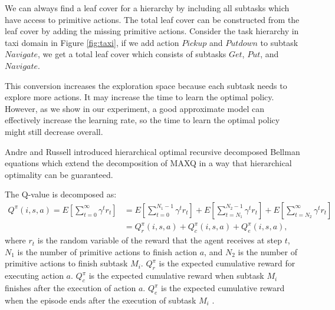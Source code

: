 We can always find a leaf cover for a hierarchy by including all subtasks which have access
to primitive actions. The total leaf cover can be constructed from the leaf cover by
adding the missing primitive actions.
Consider the task hierarchy in taxi domain in Figure \ref{fig:taxi},
if we add action $Pickup$ and $Putdown$ to subtask $Navigate$, 
we get a total leaf cover which consists of subtasks $Get$, $Put$, and $Navigate$.

This conversion increases the exploration space because each subtask needs to explore more actions. It may increase 
the time to learn the optimal policy. However, as we show in our experiment, a good approximate model can effectively increase
the learning rate, so the time to learn the optimal policy might still decrease overall.


Andre and Russell \cite{OptimalQ}\cite{HORDQ} introduced hierarchical optimal recursive decomposed Bellman equations
which extend the decomposition of MAXQ in a way that hierarchical optimality
can be guaranteed.

The Q-value is decomposed as:
\begin{align}
    \label{eq:HordQ}
    Q^{\pi}(i, s, a) = E[\sum_{t=0}^{\infty}\gamma^t r_t] &= E[\sum_{t=0}^{N_1 - 1}\gamma^t r_t] + E[\sum_{t=N_1}^{N_2 - 1}\gamma^t r_t] + E[\sum_{t=N_2}^{\infty}\gamma^t r_t]\\
                    &= Q_r^{\pi}(i, s, a) + Q_c^{\pi}(i, s, a) + Q_e^{\pi}(i, s, a),
\end{align}
where $r_t$ is the random variable of the reward that the agent receives at step $t$, $N_1$ is the number of primitive actions to finish action $a$, 
and $N_2$ is the number of primitive actions 
to finish subtask $M_i$. $ Q_r^{\pi}$ is the expected cumulative reward for executing action $a$.
$Q_c^{\pi}$ is the expected cumulative reward when subtask $M_i$ finishes after the execution of action $a$. 
$Q_e^{\pi}$ is the expected cumulative reward when the episode ends after the execution of subtask $M_i$ .

